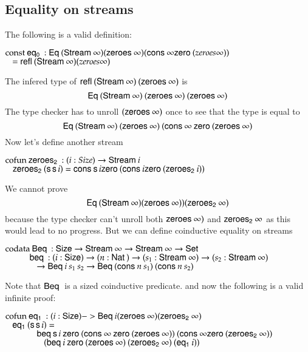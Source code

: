 \subsection{Equality on streams}
The following is a valid definition:
\begin{bsp}
$\mathrm{const}\: \mathsf{eq_0}\: : \mathsf{Eq}\: (\mathsf{Stream}\: \infty) (\mathsf{zeroes}\: \infty) (\mathsf{cons}\: \infty \mathsf{zero}\: (zeroes \infty))$\\
$\hspace*{3mm} = \mathsf{refl}\: (\mathsf{Stream}\: \infty) (zeroes \infty)$
\end{bsp}
The infered type of $\mathsf{refl}\: (\mathsf{Stream}\: \infty) \: (\mathsf{zeroes}\: \infty)$ is 
\[\mathsf{Eq}\: (\mathsf{Stream}\: \infty) \: (\mathsf{zeroes}\: \infty) \: (\mathsf{zeroes}\: \infty)\]
The type checker has to unroll $(\mathsf{zeroes}\: \infty)$ once to see that the type is equal to 
\[
\mathsf{Eq}\: (\mathsf{Stream}\: \infty) \: (\mathsf{zeroes}\: \infty) \: (\mathsf{cons}\: \infty \: \mathsf{zero}\: (\mathsf{zeroes}\: \infty)
\]
Now let's define another stream
\begin{bsp}
$\mathrm{cofun}\: \mathsf{zeroes_2}\:: ( i : Size ) \rightarrow{\mathsf{Stream}\:i} $ \\
$\hspace*{3mm} \mathsf{zeroes_2}\: (\mathsf{s}\, \mathsf{s}\, i) = \mathsf{cons}\: \mathsf{s}\, i \mathsf{zero}\: (\mathsf{cons}\: i \mathsf{zero}\: (\mathsf{zeroes_2}\: i))$\\
\end{bsp}
We cannot prove \[\mathsf{Eq}\: (\mathsf{Stream}\: \infty) (\mathsf{zeroes}\: \infty)) (\mathsf{zeroes_2}\: \infty)\]
because the type checker can't unroll both $\mathsf{zeroes}\: \infty)$ and $\mathsf{zeroes_2}\: \infty$ as
this would lead to no progress.
But we can define coinductive equality  on streams \cite{coquand-infinite}
\begin{bsp}
$\mathrm{codata}\: \mathsf{Beq}\: : \mathsf{Size} \rightarrow \mathsf{Stream}\: \infty \rightarrow \mathsf{Stream}\: \infty \rightarrow \mathsf{Set}$\\
$ \spcx \beq : (i : \Size ) \ra ( n : \Nat ) \ra (s_1 : \Stream \infty ) \ra (s_2 : \Stream \infty )$\\
$ \spcx \spc  \ra \beqd i \: s_1 \: s_2 \ra \beqd (\cons n \: s_1) \: (\cons n \: s_2)$
\end{bsp}
Note that $\mathsf{Beq}\:$ is a sized coinductive predicate.
and now the following is a valid infinite proof:
\begin{bsp}
$\mathrm{cofun}\: \mathsf{eq_1}\: : (i : \mathsf{Size} ) -> \mathsf{Beq}\: i (\mathsf{zeroes}\: \infty) (\mathsf{zeroes_2}\: \infty)$\\
$\hspace*{3mm} \mathsf{eq_1}\: (\mathsf{s}\, \mathsf{s}\, i) = $\\
$\spc \spcx \beq \s i \: \zero (\cons \infty \: \zero (\zeroes \infty)) \: (\cons \infty \zero (\zeroest \infty))$\\ 
$\spc \spcx \spc (\beq i \: \zero (\zeroes \infty) \: (\zeroest \infty) \: (\eqt i))$
\end{bsp}

